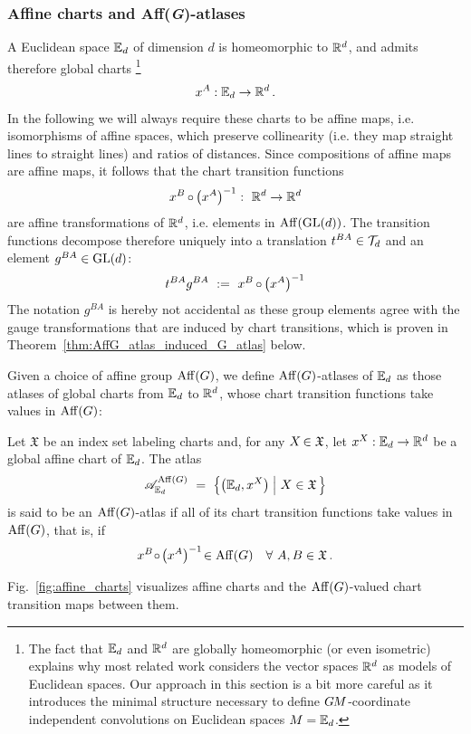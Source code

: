 \subsubsection{Affine charts and Aff(\textit{G})-atlases}
A Euclidean space $\mathbb{E}_d$ of dimension $d$ is homeomorphic to $\mathbb{R}^d$, and admits therefore global charts%
\footnote{
    The fact that $\mathbb{E}_d$ and $\mathbb{R}^d$ are globally homeomorphic (or even isometric) explains why most related work considers the vector spaces $\mathbb{R}^d$ as models of Euclidean spaces.
    Our approach in this section is a bit more careful as it introduces the minimal structure necessary to define $G\mkern-1.4muM$-coordinate independent convolutions on Euclidean spaces $M=\mathbb{E}_d$.
}
\begin{align}
    x^A: \mathbb{E}_d \to \mathbb{R}^d \,.
\end{align}
In the following we will always require these charts to be affine maps, i.e. isomorphisms of affine spaces, which preserve collinearity (i.e. they map straight lines to straight lines) and ratios of distances.
Since compositions of affine maps are affine maps, it follows that the chart transition functions
\begin{align}
    x^B \mkern-1mu\circ\mkern-1mu \big(x^A \big)^{-1}:\ \mathbb{R}^d \to \mathbb{R}^d
\end{align}
are affine transformations of $\mathbb{R}^d$, i.e. elements in $\operatorname{Aff}(\operatorname{GL}(d))$.
The transition functions decompose therefore uniquely into a translation $t^{BA} \in \mathcal{T}_d$ and an element $g^{BA} \in \operatorname{GL}(d)$:
\begin{align}
    t^{BA} g^{BA}\ :=\ x^B \mkern-1mu\circ\mkern-1mu \big(x^A \big)^{-1}
\end{align}
The notation $g^{BA}$ is hereby not accidental as these group elements agree with the gauge transformations that are induced by chart transitions, which is proven in Theorem~\ref{thm:AffG_atlas_induced_G_atlas} below.

Given a choice of affine group $\operatorname{Aff}(G)$, we define $\operatorname{Aff}(G)$-atlases of $\mathbb{E}_d$ as those atlases of global charts from $\mathbb{E}_d$ to $\mathbb{R}^d$, whose chart transition functions take values in $\operatorname{Aff}(G)$:
\begin{dfn}
\label{dfn:AffG_atlas}
    Let $\mathfrak{X}$ be an index set labeling charts and, for any ${X \mkern-2mu\in \mathfrak{X}}$, let $x^X: \mathbb{E}_d \to \mathbb{R}^d$ be a global affine chart of $\mathbb{E}_d$.
    The atlas
    \begin{align}
        \mathscr{A}^{\Aff(G)}_{\Euc_d}\ =\ \pig\{ \big( \Euc_d, x^X \big) \;\pig|\ X\in \mathfrak{X} \,\pig\}
    \end{align}
    is said to be an $\operatorname{Aff}(G)$-atlas if all of its chart transition functions take values in $\operatorname{Aff}(G)$, that is, if
    \begin{align}
        x^B \mkern-3mu\circ\mkern-2mu \big(x^A\big)^{-1} \!\in \operatorname{Aff}(G) \quad \forall\ A,B \in \mathfrak{X} \,.
    \end{align}
\end{dfn}
Fig.~\ref{fig:affine_charts} visualizes affine charts and the $\operatorname{Aff}(G)$-valued chart transition maps between them.



